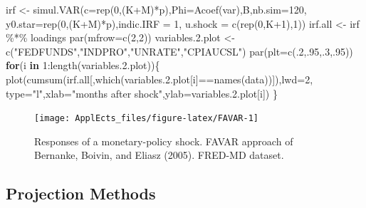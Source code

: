 \documentclass[
  12pt,
]{book}
\newenvironment{Shaded}{\begin{snugshade}}{\end{snugshade}}
\newcommand{\AttributeTok}[1]{\textcolor[rgb]{0.77,0.63,0.00}{#1}}
\newcommand{\ControlFlowTok}[1]{\textcolor[rgb]{0.13,0.29,0.53}{\textbf{#1}}}
\newcommand{\DecValTok}[1]{\textcolor[rgb]{0.00,0.00,0.81}{#1}}
\newcommand{\FloatTok}[1]{\textcolor[rgb]{0.00,0.00,0.81}{#1}}
\newcommand{\FunctionTok}[1]{\textcolor[rgb]{0.00,0.00,0.00}{#1}}
\newcommand{\NormalTok}[1]{#1}
\newcommand{\OtherTok}[1]{\textcolor[rgb]{0.56,0.35,0.01}{#1}}
\newcommand{\SpecialCharTok}[1]{\textcolor[rgb]{0.00,0.00,0.00}{#1}}
\newcommand{\StringTok}[1]{\textcolor[rgb]{0.31,0.60,0.02}{#1}}
\theoremstyle{definition}
\theoremstyle{definition}
\theoremstyle{definition}
\theoremstyle{definition}
\theoremstyle{remark}
\begin{document}
\begin{Shaded}
\begin{Highlighting}[]
\NormalTok{irf }\OtherTok{\textless{}{-}} \FunctionTok{simul.VAR}\NormalTok{(}\AttributeTok{c=}\FunctionTok{rep}\NormalTok{(}\DecValTok{0}\NormalTok{,(K}\SpecialCharTok{+}\NormalTok{M)}\SpecialCharTok{*}\NormalTok{p),}\AttributeTok{Phi=}\FunctionTok{Acoef}\NormalTok{(var),B,}\AttributeTok{nb.sim=}\DecValTok{120}\NormalTok{,}
                 \AttributeTok{y0.star=}\FunctionTok{rep}\NormalTok{(}\DecValTok{0}\NormalTok{,(K}\SpecialCharTok{+}\NormalTok{M)}\SpecialCharTok{*}\NormalTok{p),}\AttributeTok{indic.IRF =} \DecValTok{1}\NormalTok{,}
                 \AttributeTok{u.shock =} \FunctionTok{c}\NormalTok{(}\FunctionTok{rep}\NormalTok{(}\DecValTok{0}\NormalTok{,K}\SpecialCharTok{+}\DecValTok{1}\NormalTok{),}\DecValTok{1}\NormalTok{))}
\NormalTok{irf.all }\OtherTok{\textless{}{-}}\NormalTok{ irf }\SpecialCharTok{\%*\%}\NormalTok{ loadings}
\FunctionTok{par}\NormalTok{(}\AttributeTok{mfrow=}\FunctionTok{c}\NormalTok{(}\DecValTok{2}\NormalTok{,}\DecValTok{2}\NormalTok{))}
\NormalTok{variables.}\FloatTok{2.}\NormalTok{plot }\OtherTok{\textless{}{-}} \FunctionTok{c}\NormalTok{(}\StringTok{"FEDFUNDS"}\NormalTok{,}\StringTok{"INDPRO"}\NormalTok{,}\StringTok{"UNRATE"}\NormalTok{,}\StringTok{"CPIAUCSL"}\NormalTok{)}
\FunctionTok{par}\NormalTok{(}\AttributeTok{plt=}\FunctionTok{c}\NormalTok{(.}\DecValTok{2}\NormalTok{,.}\DecValTok{95}\NormalTok{,.}\DecValTok{3}\NormalTok{,.}\DecValTok{95}\NormalTok{))}
\ControlFlowTok{for}\NormalTok{(i }\ControlFlowTok{in} \DecValTok{1}\SpecialCharTok{:}\FunctionTok{length}\NormalTok{(variables.}\FloatTok{2.}\NormalTok{plot))\{}
  \FunctionTok{plot}\NormalTok{(}\FunctionTok{cumsum}\NormalTok{(irf.all[,}\FunctionTok{which}\NormalTok{(variables.}\FloatTok{2.}\NormalTok{plot[i]}\SpecialCharTok{==}\FunctionTok{names}\NormalTok{(data))]),}\AttributeTok{lwd=}\DecValTok{2}\NormalTok{,}
       \AttributeTok{type=}\StringTok{"l"}\NormalTok{,}\AttributeTok{xlab=}\StringTok{"months after shock"}\NormalTok{,}\AttributeTok{ylab=}\NormalTok{variables.}\FloatTok{2.}\NormalTok{plot[i])}
\NormalTok{\}}
\end{Highlighting}
\end{Shaded}

\begin{figure}
\texttt{[image: ApplEcts\_files/figure-latex/FAVAR-1]} \caption{Responses of a monetary-policy shock. FAVAR approach of Bernanke, Boivin, and Eliasz (2005). FRED-MD dataset.}\label{fig:FAVAR}
\end{figure}

\hypertarget{Projections}{%
\subsection{Projection Methods}\label{Projections}}
\end{document}
